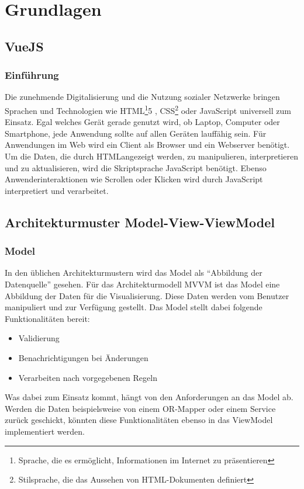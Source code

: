\chapter{Grundlagen}
\label{sec:grundl}
\section{VueJS}
\subsection{Einf\"uhrung}
Die zunehmende Digitalisierung und die Nutzung sozialer Netzwerke bringen Sprachen und Technologien wie \ac{HTML}\footnote{Sprache, die es erm\"oglicht, Informationen im Internet zu pr\"asentieren}5 , \ac{CSS}\footnote{Stilsprache, die das Aussehen von \ac{HTML}-Dokumenten definiert} oder JavaScript universell zum Einsatz. Egal welches Ger\"at gerade genutzt wird, ob Laptop, Computer oder Smartphone, jede Anwendung sollte auf allen Ger\"aten lauff\"ahig sein\cite{Teufel2018}.
F\"ur Anwendungen im Web wird ein Client als Browser und ein Webserver ben\"otigt. Um die Daten, die durch \ac{HTML}angezeigt werden, zu manipulieren, interpretieren und zu aktualisieren, wird die Skriptsprache JavaScript ben\"otigt\cite{UniHagenWeb}. Ebenso Anwenderinteraktionen wie Scrollen oder Klicken wird durch JavaScript interpretiert und verarbeitet.




\section{Architekturmuster Model-View-ViewModel}

\subsection*{Model}
In  den \"ublichen Architekturmustern wird das Model als \enquote{Abbildung der Datenquelle} gesehen. F\"ur das  Architekturmodell \ac{MVVM} ist das Model eine Abbildung der Daten f\"ur die Visualisierung. Diese Daten werden vom Benutzer manipuliert und zur Verf\"ugung gestellt.
Das Model stellt dabei folgende Funktionalit\"aten bereit:
\begin{itemize}
\item Validierung
\item Benachrichtigungen bei \"Anderungen
\item Verarbeiten nach vorgegebenen Regeln
\end{itemize}
Was dabei zum Einsatz kommt, h\"angt von den Anforderungen an das Model ab. Werden die Daten beispielsweise von einem OR-Mapper oder einem Service zur\"uck geschickt, k\"onnten diese Funktionalit\"aten ebenso in das ViewModel implementiert werden\cite{EderModel2017}.

